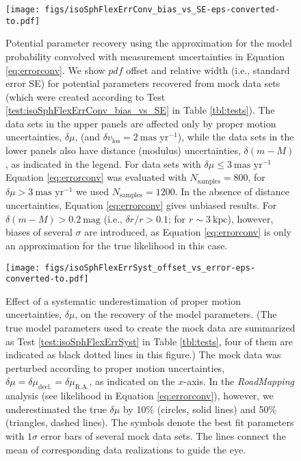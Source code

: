 \documentclass[iop,revtex4,numberedappendix,appendixfloats]{emulateapj}
\newcommand{\pdf}{\ensuremath{pdf}}
\newcommand{\RM}{{\sl RoadMapping}}
\begin{document}
\begin{figure}[!htbp]
\centering
\texttt{[image: figs/isoSphFlexErrConv\_bias\_vs\_SE-eps-converted-to.pdf]}
\caption{Potential parameter recovery using the approximation for the model probability convolved with measurement uncertainties in Equation \eqref{eq:errorconv}. We show \pdf{} offset and relative width (i.e., standard error SE) for potential parameters recovered from mock data sets (which were created according to Test \ref{test:isoSphFlexErrConv_bias_vs_SE} in Table \ref{tbl:tests}). The data sets in the upper panels are affected only by proper motion uncertainties, $\delta \mu$, (and $\delta v_\text{los}=2~\text{mas yr}^{-1}$), while the data sets in the lower panels also have distance (modulus) uncertainties, $\delta (m-M)$, as indicated in the legend. For data sets with $\delta \mu \leq 3 ~\text{mas yr}^{-1}$ Equation \eqref{eq:errorconv} was evaluated with $N_\text{samples}=800$, for $\delta \mu > 3~\text{mas yr}^{-1}$ we used $N_\text{samples}=1200$. In the absence of distance uncertainties, Equation \eqref{eq:errorconv} gives unbiased results. For $\delta(m-M) > 0.2~\text{mag}$ (i.e., $\delta r/r > 0.1$; for $r \sim 3~\text{kpc}$), however, biases of several $\sigma$ are introduced, as Equation \eqref{eq:errorconv} is only an approximation for the true likelihood in this case.}
\label{fig:isoSphFlexErrConv_bias_vs_SE}
\end{figure}

\begin{figure}[!htbp]
\centering
\texttt{[image: figs/isoSphFlexErrSyst\_offset\_vs\_error-eps-converted-to.pdf]}
\caption{Effect of a systematic underestimation of proper motion uncertainties, $\delta \mu$, on the recovery of the model parameters. (The true model parameters used to create the mock data are summarized as Test \ref{test:isoSphFlexErrSyst} in Table \ref{tbl:tests}, four of them are indicated as black dotted lines in this figure.) The mock data was perturbed according to proper motion uncertainties, $\delta \mu = \delta \mu_\text{decl.} = \delta \mu_\text{R.A.}$, as indicated on the $x$-axis. In the \RM{} analysis (see likelihood in Equation \eqref{eq:errorconv}), however, we underestimated the true $\delta \mu$ by 10\% (circles, solid lines) and 50\% (triangles, dashed lines). The symbols denote the best fit parameters with $1\sigma$ error bars of several mock data sets. The lines connect the mean of corresponding data realizations to guide the eye.}
\label{fig:isoSphFlexErrSyst}
\end{figure}
\end{document}
